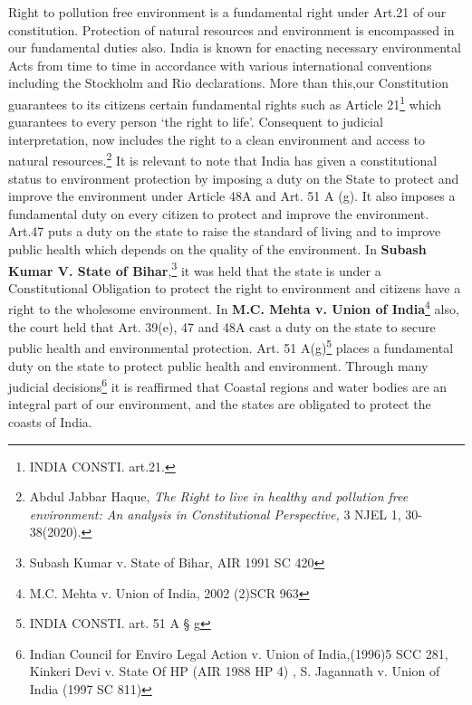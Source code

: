 \begin{multicols}{2}
\noi
Right to pollution free environment is a fundamental right under Art.21 of our constitution.
Protection of natural resources and environment is encompassed in our fundamental duties
also. India is known for enacting necessary environmental Acts from time to time in
accordance with various international conventions including the Stockholm and Rio
declarations. More than this,our Constitution guarantees to its citizens certain fundamental
rights such as Article 21\footnote{INDIA CONSTI. art.21.}  which guarantees to every person ‘the right to life’. Consequent to
judicial interpretation, now includes the right to a clean environment and access to natural
resources.\footnote{Abdul Jabbar Haque, \textit{The Right to live in healthy and pollution free environment: An analysis in Constitutional Perspective,} 3 NJEL 1, 30-38(2020).} It is relevant to note that India has given a constitutional status to environment
protection by imposing a duty on the State to protect and improve the environment under
Article 48A and Art. 51 A (g). It also imposes a fundamental duty on every citizen to protect
and improve the environment. Art.47 puts a duty on the state to raise the standard of living
and to improve public health which depends on the quality of the environment. In \textbf{Subash
Kumar V. State of Bihar},\footnote{Subash Kumar v. State of Bihar, AIR 1991 SC 420} it was held that the state is under a Constitutional Obligation to
protect the right to environment and citizens have a right to the wholesome environment. In
\textbf{M.C. Mehta v. Union of India}\footnote{M.C. Mehta v. Union of India, 2002 (2)SCR 963} also, the court held that Art. 39(e), 47 and 48A cast a duty
on the state to secure public health and environmental protection. Art. 51 A(g)\footnote{INDIA CONSTI. art. 51 A § g} places a
fundamental duty on the state to protect public health and environment. Through many
judicial decisions\footnote{Indian Council for Enviro Legal Action v. Union of India,(1996)5 SCC 281, Kinkeri Devi v. State Of HP (AIR 1988 HP 4) , S. Jagannath v. Union of India (1997 SC 811)} it is reaffirmed that Coastal regions and water bodies are an integral part
of our environment, and the states are obligated to protect the coasts of India.



\end{multicols}
